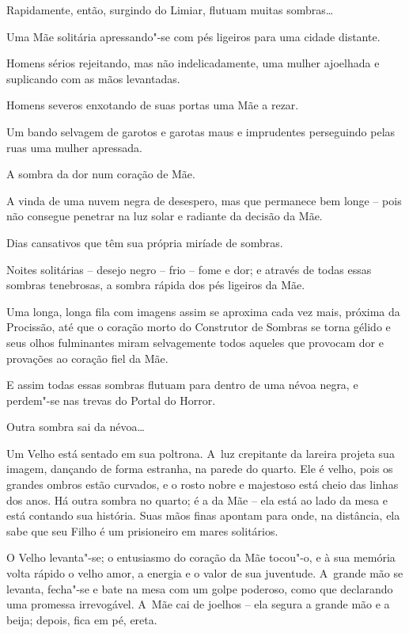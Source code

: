 \smallskip
Rapidamente, então, surgindo do Limiar, flutuam muitas sombras…

\smallskip
Uma Mãe solitária apressando"-se com pés ligeiros para uma cidade
distante.

\smallskip
Homens sérios rejeitando, mas não indelicadamente, uma mulher ajoelhada e
suplicando com as mãos levantadas.

\smallskip
Homens severos enxotando de suas portas uma Mãe a rezar.

\smallskip
Um bando selvagem de garotos e garotas maus e imprudentes perseguindo
pelas ruas uma mulher apressada.

\smallskip
A sombra da dor num coração de Mãe.

\smallskip
A vinda de uma nuvem negra de desespero, mas que permanece bem longe --
pois não consegue penetrar na luz solar e radiante da decisão da Mãe.

\smallskip
Dias cansativos que têm sua própria miríade de sombras.

\smallskip
Noites solitárias -- desejo negro -- frio -- fome e dor; e através de
todas essas sombras tenebrosas, a sombra rápida dos pés ligeiros da Mãe.

\smallskip
Uma longa, longa fila com imagens assim se aproxima cada vez mais,
próxima da Procissão, até que o coração morto do Construtor de Sombras se
torna gélido e seus olhos fulminantes miram selvagemente todos
aqueles que provocam dor e provações ao coração fiel da Mãe.

E assim todas essas sombras flutuam para dentro de uma névoa negra, e
perdem"-se nas trevas do Portal do Horror.

\smallskip
Outra sombra sai da névoa…

Um Velho está sentado em sua poltrona. A~luz crepitante da lareira
projeta sua imagem, dançando de forma estranha, na parede do quarto. Ele
é velho, pois os grandes ombros estão curvados, e o rosto nobre e
majestoso está cheio das linhas dos anos. Há outra sombra no
quarto; é a da Mãe -- ela está ao lado da mesa e está contando sua
história. Suas mãos finas apontam para onde, na distância, ela sabe que seu
Filho é um prisioneiro em mares solitários.

O Velho levanta"-se; o entusiasmo do coração da Mãe tocou"-o, e à sua
memória volta rápido o velho amor, a energia e o valor de sua
juventude. A~grande mão se levanta, fecha"-se e bate na mesa com um golpe
poderoso, como que declarando uma promessa irrevogável. A~Mãe cai de
joelhos -- ela segura a grande mão e a beija; depois, fica em pé, ereta.

